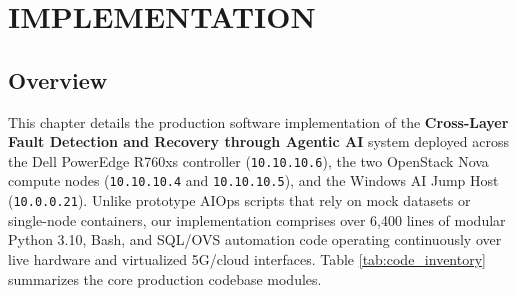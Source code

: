 
\chapter{IMPLEMENTATION}

\section{Overview}
This chapter details the production software implementation of the \textbf{Cross-Layer Fault Detection and Recovery through Agentic AI} system deployed across the Dell PowerEdge R760xs controller (\texttt{10.10.10.6}), the two OpenStack Nova compute nodes (\texttt{10.10.10.4} and \texttt{10.10.10.5}), and the Windows AI Jump Host (\texttt{10.0.0.21}). Unlike prototype AIOps scripts that rely on mock datasets or single-node containers, our implementation comprises over 6,400 lines of modular Python 3.10, Bash, and SQL/OVS automation code operating continuously over live hardware and virtualized 5G/cloud interfaces. Table \ref{tab:code_inventory} summarizes the core production codebase modules.

